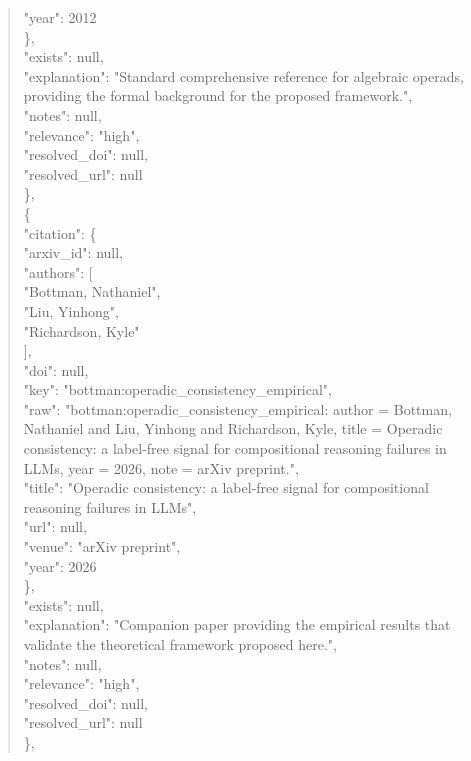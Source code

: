 \documentclass[11pt]{article}
\begin{document}
\begin{quote}
        "year": 2012\\
      \},\\
      "exists": null,\\
      "explanation": "Standard comprehensive reference for algebraic operads, providing the formal background for the proposed framework.",\\
      "notes": null,\\
      "relevance": "high",\\
      "resolved\_doi": null,\\
      "resolved\_url": null\\
    \},\\
    \{\\
      "citation": \{\\
        "arxiv\_id": null,\\
        "authors": [\\
          "Bottman, Nathaniel",\\
          "Liu, Yinhong",\\
          "Richardson, Kyle"\\
        ],\\
        "doi": null,\\
        "key": "bottman:operadic\_consistency\_empirical",\\
        "raw": "bottman:operadic\_consistency\_empirical: author = Bottman, Nathaniel and Liu, Yinhong and Richardson, Kyle, title = Operadic consistency: a label-free signal for compositional reasoning failures in LLMs, year = 2026, note = arXiv preprint.",\\
        "title": "Operadic consistency: a label-free signal for compositional reasoning failures in LLMs",\\
        "url": null,\\
        "venue": "arXiv preprint",\\
        "year": 2026\\
      \},\\
      "exists": null,\\
      "explanation": "Companion paper providing the empirical results that validate the theoretical framework proposed here.",\\
      "notes": null,\\
      "relevance": "high",\\
      "resolved\_doi": null,\\
      "resolved\_url": null\\
    \},\\

\end{quote}
\end{document}
